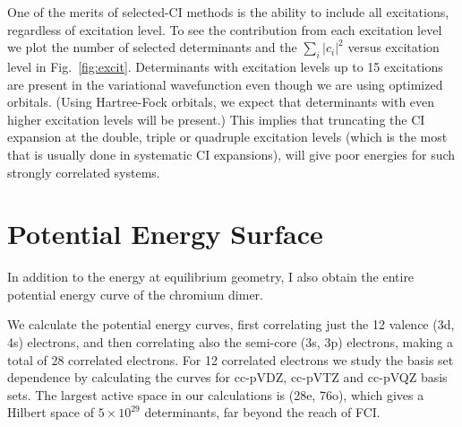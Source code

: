 One of the merits of selected-CI methods is the ability to include all excitations, regardless of excitation level.
To see the contribution from each excitation level we plot the number of selected determinants and the $\sum_i \left|c_i\right|^2$ versus excitation level in Fig.~\ref{fig:excit}.
Determinants with excitation levels up to 15 excitations are present in the variational wavefunction even though we are using optimized orbitals.
(Using Hartree-Fock orbitals, we expect that determinants with even higher excitation levels will be present.)
This implies that truncating the CI expansion at the double, triple or quadruple excitation levels (which is the most that is usually done in systematic
CI expansions), will give poor energies for such strongly correlated systems.

\section{Potential Energy Surface}
In addition to the energy at equilibrium geometry, I also obtain the entire potential energy curve of the chromium dimer.

We calculate the potential energy curves, first correlating just the 12 valence (3d, 4s) electrons, and then correlating
also the semi-core (3s,
3p) electrons, making a total of 28 correlated electrons.
For 12 correlated electrons we study the basis set dependence by calculating the curves for cc-pVDZ, cc-pVTZ and cc-pVQZ basis sets.
The largest active space in our calculations is (28e, 76o), which gives a Hilbert space of $5\times10^{29}$ determinants, far beyond the reach of FCI.

